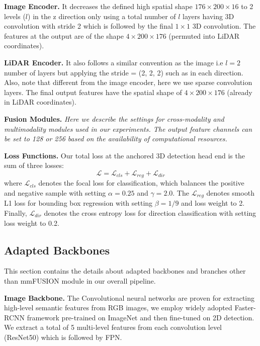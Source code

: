 \documentclass[10pt,twocolumn,letterpaper]{article}
\begin{document}
\textbf{Image Encoder.}
It decreases the defined high spatial shape $176\times200\times16$ to 2 levels ($l$) in the z direction only using a total number of $l$ layers having 3D convolution with stride 2 which is followed by the final $1\times1$ 3D convolution. The features at the output are of the shape $4\times200\times176$ (permuted into LiDAR coordinates).

\textbf{LiDAR Encoder.} 
It also follows a similar convention as the image i.e $l=2$ number of layers but applying the stride = (2, 2, 2) such as in each direction. Also, note that different from the image encoder, here we use sparse convolution layers. The final output features have the spatial shape of $4\times200\times176$ (already in LiDAR coordinates). 

\textbf{Fusion Modules.}
\textit{Here we describe the settings for cross-modality and multimodality modules used in our experiments. The output feature channels can be set to 128 or 256 based on the availability of computational resources.}

\textbf{Loss Functions.}
Our total loss at the anchored 3D detection head end is the sum of three losses:
\begin{equation}
    \mathcal{L} = \mathcal{L}_{cls} + \mathcal{L}_{reg} + \mathcal{L}_{dir}
\end{equation}
where $\mathcal{L}_{cls}$ denotes the focal loss \cite{lin2017focal} for classification, which balances the positive and negative sample with setting $\alpha = 0.25$ and $\gamma = 2.0$.
The $\mathcal{L}_{reg}$ denotes smooth L1 loss \cite{girshick2015fast} for bounding box regression with setting $\beta=1/9$ and loss weight to 2.
Finally, $\mathcal{L}_{dir}$ denotes the cross entropy loss for direction classification with setting loss weight to 0.2.


\subsection{Adapted Backbones}
This section contains the details about adapted backbones and branches other than mmFUSION module in our overall pipeline.  

\textbf{Image Backbone.}
The Convolutional neural networks are proven for extracting high-level semantic features from RGB images, we employ widely adopted Faster-RCNN framework \cite{ren2015faster} pre-trained on ImageNet and then fine-tuned on 2D detection. We extract a total of 5 multi-level features from each convolution level (ResNet50) which is followed by FPN.
\end{document}
